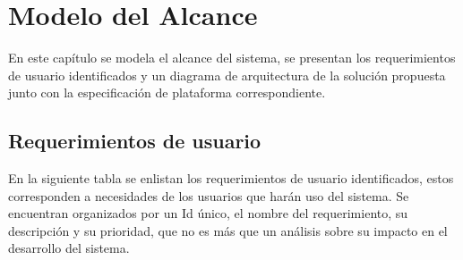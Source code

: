 \chapter{Modelo del Alcance}
\label{cap:reqUsr}

	En este capítulo se modela el alcance del sistema, se presentan  los requerimientos de usuario identificados y un diagrama de arquitectura de la solución propuesta junto con la especificación de plataforma correspondiente.




\section{Requerimientos de usuario}

En la siguiente tabla se enlistan los requerimientos de usuario identificados, estos corresponden a necesidades de los usuarios que harán uso del sistema. Se encuentran organizados por un Id único, el nombre del requerimiento, su descripción y su prioridad, que no es más que un análisis sobre su impacto en el desarrollo del sistema. 



